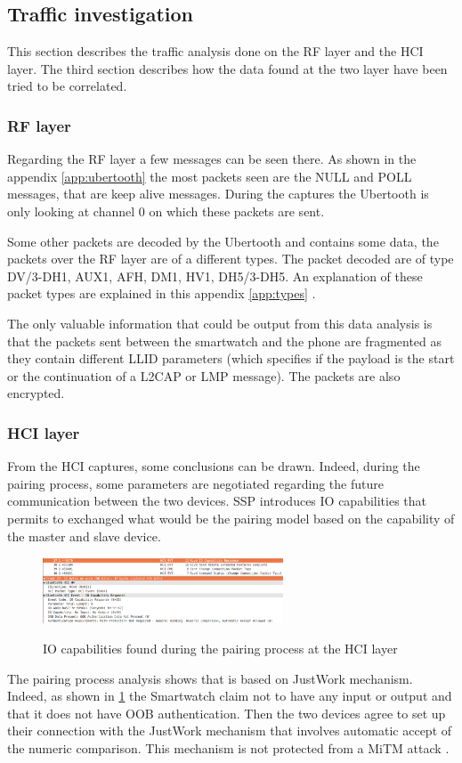\subsection{Traffic investigation}
This section describes the traffic analysis done on the RF layer and the HCI layer. The third section describes how the data found at the two layer have been tried to be correlated.
\subsubsection{RF layer}
\label{subsubsection:rflayer}
Regarding the RF layer a few messages can be seen there. As shown in the appendix \ref{app:ubertooth} the most packets seen are the NULL and POLL messages, that are keep alive messages. During the captures the Ubertooth is only looking at channel 0 on which these packets are sent.


Some other packets are decoded by the Ubertooth and contains some data, the packets over the RF layer are of a different types. The packet decoded are of type DV/3-DH1, AUX1, AFH, DM1, HV1, DH5/3-DH5. An explanation of these packet types are explained in this appendix \ref{app:types} .

The only valuable information that could be output from this data analysis is that the packets sent between the smartwatch and the phone are fragmented as they contain different LLID parameters (which specifies if the payload is the start or the continuation of a L2CAP or LMP message). The packets are also encrypted.

\subsubsection{HCI layer}
From the HCI captures, some conclusions can be drawn. Indeed, during the pairing process, some parameters are negotiated regarding the future communication between the two devices. SSP introduces IO capabilities that permits to exchanged what would be the pairing model based on the capability of the master and slave device. 
\begin{figure}[!h]
  \begin{center}
	\includegraphics[width=270px]{images/IO_PARAM.png}
	\label{fig:io}
	\caption{IO capabilities found during the pairing process at the HCI layer}
  \end{center}
\end{figure}
The pairing process analysis shows that is based on JustWork mechanism. Indeed, as shown in \ref{fig:io} the Smartwatch claim not to have any input or output and that it does not have OOB authentication. Then the two devices agree to set up their connection with the JustWork mechanism that involves automatic accept of the numeric comparison. This mechanism is not protected from a MiTM attack \cite{MiTMjustworks}.

